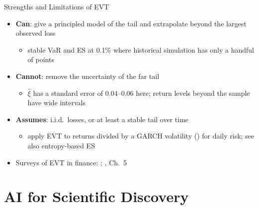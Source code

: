\begin{frame}{Strengths and Limitations of EVT}
\itemsize{\small}
\begin{itemize}
    \item \textbf{Can}: give a principled model of the tail and extrapolate beyond the largest observed loss
    \begin{itemize}
        \item stable VaR and ES at 0.1\% where historical simulation has only a handful of points
    \end{itemize}
    \item \textbf{Cannot}: remove the uncertainty of the far tail
    \begin{itemize}
        \item $\hat\xi$ has a standard error of $0.04$--$0.06$ here; return levels beyond the sample have wide intervals
    \end{itemize}
    \item \textbf{Assumes}: i.i.d.\ losses, or at least a stable tail over time
    \begin{itemize}
        \item apply EVT to returns divided by a GARCH volatility () for daily risk; see also entropy-based ES 
    \end{itemize}
    \item Surveys of EVT in finance: ; , Ch.~5
\end{itemize}
\end{frame}


\section{AI for Scientific Discovery}

